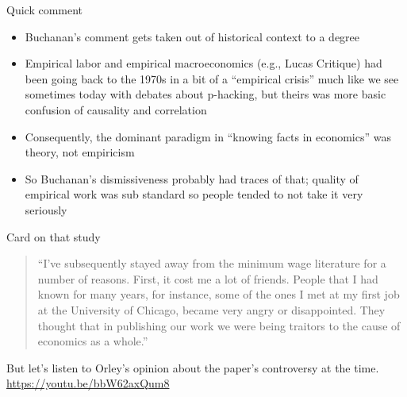 \documentclass{beamer}
\begin{document}
\begin{frame}{Quick comment}

\begin{itemize}
\item Buchanan's comment gets taken out of historical context to a degree
\item Empirical labor and empirical macroeconomics (e.g., Lucas Critique) had been going back to the 1970s in a bit of a ``empirical crisis'' much like we see sometimes today with debates about p-hacking, but theirs was more basic confusion of causality and correlation
\item Consequently, the dominant paradigm in ``knowing facts in economics'' was theory, not empiricism
\item So Buchanan's dismissiveness probably had traces of that; quality of empirical work was sub standard so people tended to not take it very seriously
\end{itemize}

\end{frame}


\begin{frame}{Card on that study}

\begin{quote}
``I’ve subsequently stayed away from the minimum wage literature for a number of reasons. First, it cost me a lot of friends. People that I had known for many years, for instance, some of the ones I met at my first job at the University of Chicago, became very angry or disappointed. They thought that in publishing our work we were being traitors to the cause of economics as a whole.''
\end{quote}

\bigskip

But let's listen to Orley's opinion about the paper's controversy at the time.  \url{https://youtu.be/bbW62axQum8}

\end{frame}
\end{document}
